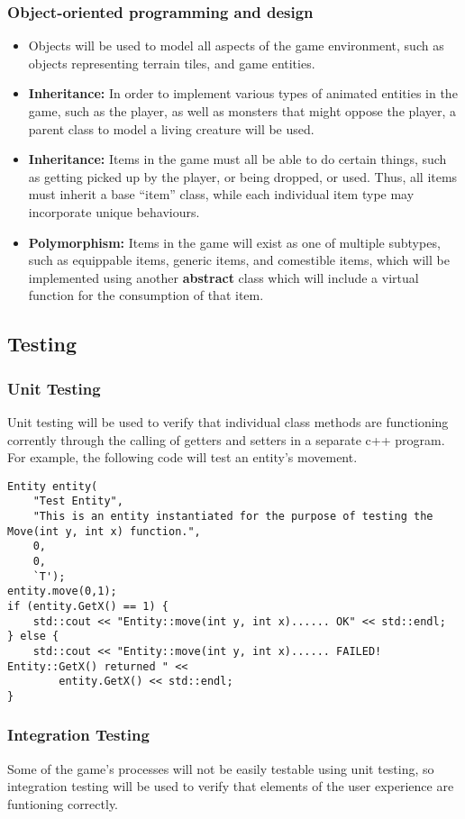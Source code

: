 \documentclass{article}
\begin{document}
\subsubsection{Object-oriented programming and design}
\begin{itemize}
    \item Objects will be used to model all aspects of the game environment, such as objects representing terrain tiles, and game entities.
    \item \textbf{Inheritance:} In order to implement various types of animated entities in the game, such as the player, as well as monsters that might oppose the player, a parent class to model a living creature will be used.
    \item \textbf{Inheritance:} Items in the game must all be able to do certain things, such as getting picked up by the player, or being dropped, or used. Thus, all items must inherit a base ``item'' class, while each individual item type may incorporate unique behaviours.
    \item \textbf{Polymorphism:} Items in the game will exist as one of multiple subtypes, such as equippable items, generic items, and comestible items, which will be implemented using another \textbf{abstract} class which will include a virtual function for the consumption of that item.
\end{itemize}
\subsection{Testing}
\subsubsection{Unit Testing}
Unit testing will be used to verify that individual class methods are functioning corrently through the calling of getters and setters in a separate c++ program. For example, the following code will test an entity's movement.
\begin{verbatim}
Entity entity(
    "Test Entity",
    "This is an entity instantiated for the purpose of testing the Move(int y, int x) function.",
    0,
    0,
    `T');
entity.move(0,1);
if (entity.GetX() == 1) {
    std::cout << "Entity::move(int y, int x)...... OK" << std::endl;
} else {
    std::cout << "Entity::move(int y, int x)...... FAILED! Entity::GetX() returned " <<
        entity.GetX() << std::endl;
}
\end{verbatim}
\subsubsection{Integration Testing}
Some of the game's processes will not be easily testable using unit testing, so integration testing will be used to verify that elements of the user experience are funtioning correctly.
\end{document}
